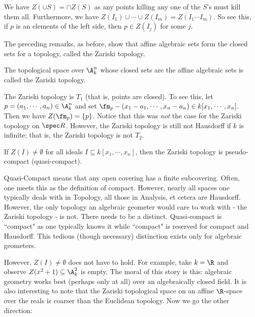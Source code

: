 \begin{rem}
We have $Z( \cup S)= \cap Z(S)$ as any points killing any one of the $S$'s must kill them all. Furthermore, we have $Z(I_1) \cup \cdots \cup Z(I_m)=Z(I_1 \cdots I_m)$. So see this, if $p$ is an elements of the left side, then $p \in Z(I_j)$ for some $j$. 
\end{rem}

The preceding remarks, as before, show that affine algebraic sets form the closed sets for a topology, called the Zariski topology. 

\begin{dfn}
The topological space over $\A_k^n$ whose closed sets are the affine algebraic sets is called the Zariski topology. 
\end{dfn}

The Zariski topology is $T_1$ (that is, points are closed). To see this, let $p=(a_1,\cdots,a_n) \in \A_k^n$ and set $\fm_p-(x_1-a_1,\cdots,x_n-a_n) \in k[x_1,\cdots,x_n]$. Then we have $Z(\fm_p)=\{p\}$. Notice that this was \emph{not} the case for the Zariski topology on $\spec R$. However, the Zariski topology is still not Hausdorff if $k$ is infinite; that is, the Zariski topology is not $T_2$. 

If $Z(I) \neq \emptyset$ for all ideals $I \subseteq k[x_1,\cdots,x_n]$, then the Zariski topology is pseudo-compact (quasi-compact).

\begin{rem}
Quasi-Compact means that any open covering has a finite subcovering. Often, one meets this as the definition of compact. However, nearly all spaces one typically deals with in Topology, all those in Analysis, et cetera are Hausdorff. However, the only topology an algebraic geometer would care to work with - the Zariski topology - is not. There needs to be a distinct. Quasi-compact is ``compact" as one typically knows it while ``compact" is reserved for compact and Hausdorff. This tedious (though necessary) distinction exists only for algebraic geometers. 
\end{rem}

However, $Z(I) \neq \emptyset$ does not have to hold. For example, take $k=\R$ and observe $Z(x^2+1) \subseteq \A_k^2$ is empty. The moral of this story is this: algebraic geometry works best (perhaps only at all) over an algebraically closed field. It is also interesting to note that the Zariski topological space on an affine $\R$-space over the reals is coarser than the Euclidean topology. Now we go the other direction:

